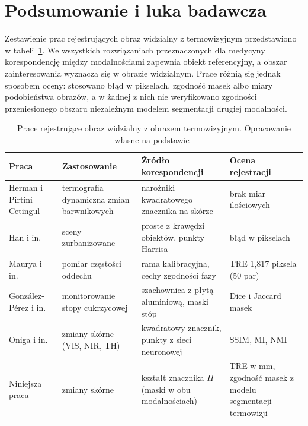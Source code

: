\section{Podsumowanie i luka badawcza}
\label{sec:luka}

Zestawienie prac rejestrujących obraz widzialny z termowizyjnym przedstawiono w tabeli~\ref{tab:prace-rgb-ir}. We wszystkich rozwiązaniach przeznaczonych dla medycyny korespondencję między modalnościami zapewnia obiekt referencyjny, a obszar zainteresowania wyznacza się w obrazie widzialnym. Prace różnią się jednak sposobem oceny: stosowano błąd w pikselach, zgodność masek albo miary podobieństwa obrazów, a w żadnej z nich nie weryfikowano zgodności przeniesionego obszaru niezależnym modelem segmentacji drugiej modalności.

\begin{table}[htbp]
  \centering
  \caption{Prace rejestrujące obraz widzialny z obrazem termowizyjnym. Opracowanie własne na podstawie~\cite{visualization-detection-cancer,visible-and-infared,non-contact-breathing-monitoring,gonzalezperez2021,oniga2026}}
  \label{tab:prace-rgb-ir}
  \small
  \begin{tabularx}{\textwidth}{>{\raggedright\arraybackslash}p{2.4cm} >{\raggedright\arraybackslash}X >{\raggedright\arraybackslash}X >{\raggedright\arraybackslash}X}
    \toprule
    Praca & Zastosowanie & Źródło korespondencji & Ocena rejestracji \\
    \midrule
    Herman i Pirtini Cetingul~\cite{visualization-detection-cancer} & termografia dynamiczna zmian barwnikowych & narożniki kwadratowego znacznika na skórze & brak miar ilościowych \\
    Han i in.~\cite{visible-and-infared} & sceny zurbanizowane & proste z krawędzi obiektów, punkty Harrisa & błąd w pikselach \\
    Maurya i in.~\cite{non-contact-breathing-monitoring} & pomiar częstości oddechu & rama kalibracyjna, cechy zgodności fazy & TRE 1,817 piksela (50 par) \\
    González-Pérez i in.~\cite{gonzalezperez2021} & monitorowanie stopy cukrzycowej & szachownica z płytą aluminiową, maski stóp & Dice i Jaccard masek \\
    Oniga i in.~\cite{oniga2026} & zmiany skórne (VIS, NIR, TH) & kwadratowy znacznik, punkty z sieci neuronowej & SSIM, MI, NMI \\
    Niniejsza praca & zmiany skórne & kształt znacznika $\Pi$ (maski w obu modalnościach) & TRE w mm, zgodność masek z modelu segmentacji termowizji \\
    \bottomrule
  \end{tabularx}
\end{table}

